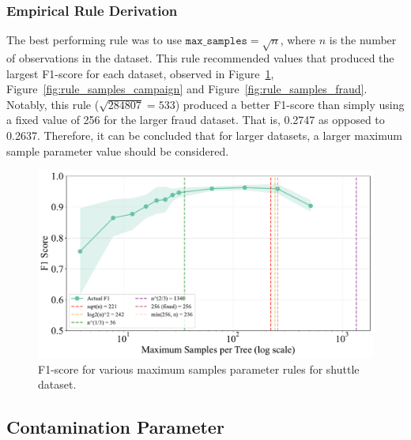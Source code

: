 \documentclass[10pt, conference]{IEEEtran}
\begin{document}
\subsubsection{Empirical Rule Derivation}
The best performing rule was to use $\texttt{max\_samples}=\sqrt{n}$, where $n$ is the number of observations in the dataset. This rule recommended values that produced the largest F1-score for each dataset, observed in Figure~\ref{fig:rule_samples_shuttle}, Figure~\ref{fig:rule_samples_campaign} and Figure~\ref{fig:rule_samples_fraud}. Notably, this rule ($\sqrt{284807}=533$) produced a better F1-score than simply using a fixed value of 256 for the larger fraud dataset. That is, 0.2747 as opposed to 0.2637. Therefore, it can be concluded that for larger datasets, a larger maximum sample parameter value should be considered.
\begin{figure}[H]
	\centering
	\includegraphics[width=0.95\linewidth]{../results/shuttle/max_samples/empirical_rules.pdf}
	\caption{F1-score for various maximum samples parameter rules for shuttle dataset.}
	\label{fig:rule_samples_shuttle}
\end{figure}



\subsection{Contamination Parameter}
\end{document}

